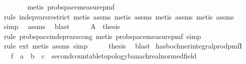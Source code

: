 \begin{isabellebody}
\ \ \ \ \ \ \isamarkupfalse%
\ {\isacharparenleft}{\kern0pt}metis\ prob{\isacharunderscore}{\kern0pt}space{\isacharunderscore}{\kern0pt}measure{\isacharunderscore}{\kern0pt}pmf{\isacharparenright}{\kern0pt}\isanewline
\ \ \ \ \ \isamarkupfalse%
\ {\isacharparenleft}{\kern0pt}rule\ indep{\isacharunderscore}{\kern0pt}vars{\isacharunderscore}{\kern0pt}restrict{\isacharcomma}{\kern0pt}\ metis\ assms{\isacharparenleft}{\kern0pt}{}{\isacharparenright}{\kern0pt}{\isacharcomma}{\kern0pt}\ metis\ assms{\isacharparenleft}{\kern0pt}{}{\isacharparenright}{\kern0pt}{\isacharcomma}{\kern0pt}\ metis\ assms{\isacharparenleft}{\kern0pt}{}{\isacharparenright}{\kern0pt}{\isacharcomma}{\kern0pt}\ metis\ assms{\isacharparenleft}{\kern0pt}{}{\isacharparenright}{\kern0pt}{\isacharparenright}{\kern0pt}\isanewline
\ \ \ \ \isamarkupfalse%
\ simp\ \isamarkupfalse%
\ assms{\isacharparenleft}{\kern0pt}{}{\isacharparenright}{\kern0pt}\ \isamarkupfalse%
\ blast\isanewline
\ \ \isamarkupfalse%
\ \isamarkupfalse%
\ {\isachardoublequoteopen}{\isacharquery}{\kern0pt}A\ {\isacharequal}{\kern0pt}\ {\isacharquery}{\kern0pt}thesis{\isachardoublequoteclose}\isanewline
\ \ \ \ \isamarkupfalse%
\ {\isacharparenleft}{\kern0pt}rule\ prob{\isacharunderscore}{\kern0pt}space{\isachardot}{\kern0pt}indep{\isacharunderscore}{\kern0pt}vars{\isacharunderscore}{\kern0pt}cong{\isacharcomma}{\kern0pt}\ metis\ prob{\isacharunderscore}{\kern0pt}space{\isacharunderscore}{\kern0pt}measure{\isacharunderscore}{\kern0pt}pmf{\isacharcomma}{\kern0pt}\ simp{\isacharparenright}{\kern0pt}\isanewline
\ \ \ \ \isamarkupfalse%
\ {\isacharparenleft}{\kern0pt}rule\ ext{\isacharcomma}{\kern0pt}\ metis\ assms{\isacharparenleft}{\kern0pt}{}{\isacharparenright}{\kern0pt}{\isacharcomma}{\kern0pt}\ simp{\isacharparenright}{\kern0pt}\isanewline
\ \ \isamarkupfalse%
\ \isamarkupfalse%
\ {\isacharquery}{\kern0pt}thesis\ \isamarkupfalse%
\ blast\isanewline
{}\isamarkupfalse%
%
\endisatagproof
{\isafoldproof}%
%
\isadelimproof
\isanewline
%
\endisadelimproof
\isanewline
{}\isamarkupfalse%
\ has{\isacharunderscore}{\kern0pt}bochner{\isacharunderscore}{\kern0pt}integral{\isacharunderscore}{\kern0pt}prod{\isacharunderscore}{\kern0pt}pmfI{\isacharcolon}{\kern0pt}\isanewline
\ \ \ f\ {\isacharcolon}{\kern0pt}{\isacharcolon}{\kern0pt}\ {\isachardoublequoteopen}{\isacharprime}{\kern0pt}a\ {\isasymRightarrow}\ {\isacharprime}{\kern0pt}b\ {\isasymRightarrow}\ {\isacharparenleft}{\kern0pt}{\isacharprime}{\kern0pt}c\ {\isacharcolon}{\kern0pt}{\isacharcolon}{\kern0pt}\ {\isacharbraceleft}{\kern0pt}second{\isacharunderscore}{\kern0pt}countable{\isacharunderscore}{\kern0pt}topology{\isacharcomma}{\kern0pt}banach{\isacharcomma}{\kern0pt}real{\isacharunderscore}{\kern0pt}normed{\isacharunderscore}{\kern0pt}field{\isacharbraceright}{\kern0pt}{\isacharparenright}{\kern0pt}{\isachardoublequoteclose}\isanewline

\end{isabellebody}
